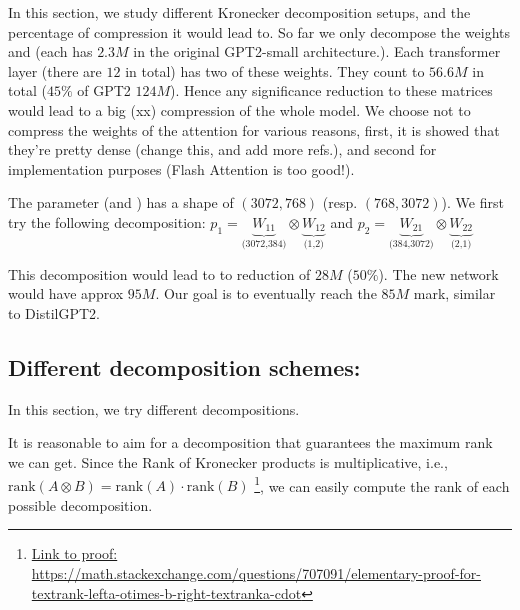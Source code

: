\documentclass{article}
\begin{document}
In this section, we study different Kronecker decomposition setups, and the percentage of compression it would  lead to. So far we only decompose the weights  and  (each has $2.3M$ in the original GPT2-small architecture.). Each transformer layer (there are $12$ in total) has two of these weights. They count to $56.6M$ in total ($45\%$ of GPT2 $124M$). Hence any significance reduction to these matrices would lead to a big (xx) compression of the whole model. We choose not to compress the weights of the attention for various reasons, first, it is showed that they're pretty dense (change this, and add more refs.), and second for implementation purposes (Flash Attention is too good!).

The parameter  (and  ) has a shape of $(3072, 768)$ (resp.  $(768, 3072)$). We first try the following decomposition: $p_1 = \underbrace{W_{11}}_{\text{(3072,384)}} \otimes \underbrace{W_{12}}_{\text{(1,2)}}$  and $p_2 = \underbrace{W_{21}}_{\text{(384,3072)}} \otimes \underbrace{W_{22}}_{\text{(2,1)}}$  %

This decomposition would lead to to reduction of $28M$ ($50\%$). The new network would have approx $95M$. Our goal is to eventually reach the $85M$ mark, similar to DistilGPT2.

\subsection{Different decomposition schemes:}%
\label{sec:Different decomposition schemes}

In this section, we try different decompositions.

It is reasonable to aim for a decomposition that guarantees the maximum rank we can get. Since the Rank of Kronecker products is multiplicative, i.e., $\mathrm{rank}(A\otimes B) = \mathrm{rank}(A)\cdot\mathrm{rank}(B)$ \footnote{\href{ https://math.stackexchange.com/questions/707091/elementary-proof-for-textrank-lefta-otimes-b-right-textranka-cdot}{Link to proof: https://math.stackexchange.com/questions/707091/elementary-proof-for-textrank-lefta-otimes-b-right-textranka-cdot}}, we can easily compute the rank of each possible decomposition.
\end{document}
